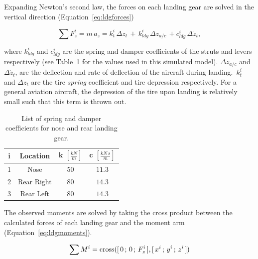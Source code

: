 Expanding Newton's second law, the forces on each landing gear are solved in the vertical direction (Equation~\ref{eq:ldgforces})

\begin{equation}
    \sum F^i_z = m\,a_z = k^i_t\, \Delta z_t\, + \, k^i_{ldg}\, \Delta z_{a/c}\, + c^i_{ldg}\, \Delta \dot{z}_t,
    \label{eq:ldgforces}
\end{equation}

where \(k^i_{ldg}\) and \(c^i_{ldg}\) are the spring and damper coefficients of the struts and levers respectively (see Table~\ref{tbl:ldgcoeff} for the values used in this simulated model). \(\Delta z_{a/c}\) and \(\Delta \dot{z}_t\), are the deflection and rate of deflection of the aircraft during landing.~\( k^i_t \) and \(\Delta z_t\) are the tire \textit{spring} coefficient and tire depression respectively. For a general aviation aircraft, the depression of the tire upon landing is relatively small such that this term is thrown out.

\begin{table}[!ht]
    \caption{List of spring and damper coefficients for nose and rear landing gear.}\label{tbl:ldgcoeff}
    \centering
    \begin{tabular}{cccc}
        \toprule
        \textbf{i} & \textbf{Location} & \(\mathbf{k}\) \(  \left[\frac{kN}{m}\right]\) & \(\mathbf{c}\) \( \left[\frac{kN\,s}{m}\right]\) \\
        \midrule
        1          & Nose              & \(50\)                                         & \(11.3\)                                         \\
        2          & Rear Right        & \(80\)                                         & \(14.3\)                                         \\
        3          & Rear Left         & \(80\)                                         & \(14.3\)                                         \\
        \bottomrule
    \end{tabular}
\end{table}

The observed moments are solved by taking the cross product between the calculated forces of each landing gear and the moment arm (Equation~\ref{eq:ldgmoments}).

\begin{equation}
    \sum M^i = \textnormal{cross}([\,0\,;\,0\,;\,F^i_z\,],[\,x^i\,;\,y^i\,;\,z^i\,])
    \label{eq:ldgmoments}
\end{equation}

